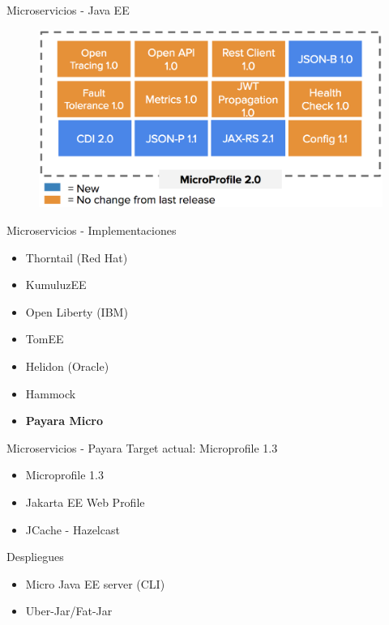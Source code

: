 \documentclass{beamer}
\begin{document}
\begin{frame}{Microservicios - Java EE}
\begin{figure}
	\centering
	\includegraphics[width=\linewidth]{Images/mp5}
\end{figure}
\end{frame}

\begin{frame}{Microservicios - Implementaciones}
\begin{itemize}
\item Thorntail (Red Hat)
\item KumuluzEE
\item Open Liberty (IBM)
\item TomEE
\item Helidon (Oracle)
\item Hammock
\item \textbf{Payara Micro}
\end{itemize}
\end{frame}

\begin{frame}{Microservicios - Payara}
Target actual: Microprofile 1.3 

\begin{itemize}
\item Microprofile 1.3
\item Jakarta EE Web Profile
\item JCache - Hazelcast
\end{itemize}

Despliegues
\begin{itemize}
\item Micro Java EE server (CLI)
\item Uber-Jar/Fat-Jar
\end{itemize}
\end{frame}
\end{document}
